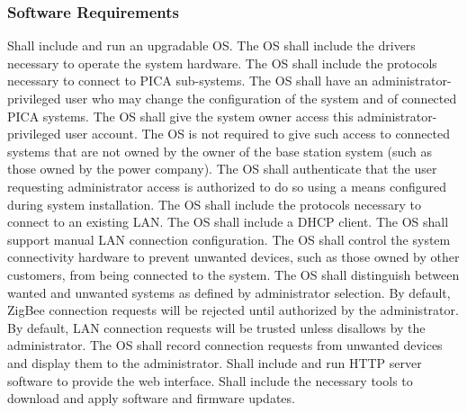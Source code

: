 \subsubsection{Software Requirements}
\begin{outline}[enumerate]
\1 Shall include and run an upgradable \ac{OS}.
\2 The \ac{OS} shall include the drivers necessary to operate the system hardware.
\2 The \ac{OS} shall include the protocols necessary to connect to PICA sub-systems.
\1 The \ac{OS} shall have an administrator-privileged user who may change the configuration of the system and of connected PICA systems.
\1 The \ac{OS} shall give the system owner access this administrator-privileged user account.
 \2 The \ac{OS} is not required to give such access to connected systems that are not owned by the owner of the base station system (such as those owned by the power company).
 \2 The \ac{OS} shall authenticate that the user requesting administrator access is authorized to do so using a means configured during system installation.
\1 The \ac{OS} shall include the protocols necessary to connect to an existing \ac{LAN}.
 \2 The \ac{OS} shall include a \ac{DHCP} client.
 \2 The \ac{OS} shall support manual \ac{LAN} connection configuration.
\1 The \ac{OS} shall control the system connectivity hardware to prevent unwanted devices, such as those owned by other customers, from being connected to the system.
 \2 The \ac{OS} shall distinguish between wanted and unwanted systems as defined by administrator selection.
  \3 By default, ZigBee connection requests will be rejected until authorized by the administrator.
  \3 By default, \ac{LAN} connection requests will be trusted unless disallows by the administrator. 
 \2 The \ac{OS} shall record connection requests from unwanted devices and display them to the administrator.
\1 Shall include and run \ac{HTTP} server software to provide the web interface.
\1 Shall include the necessary tools to download and apply software and firmware updates.
\end{outline}

